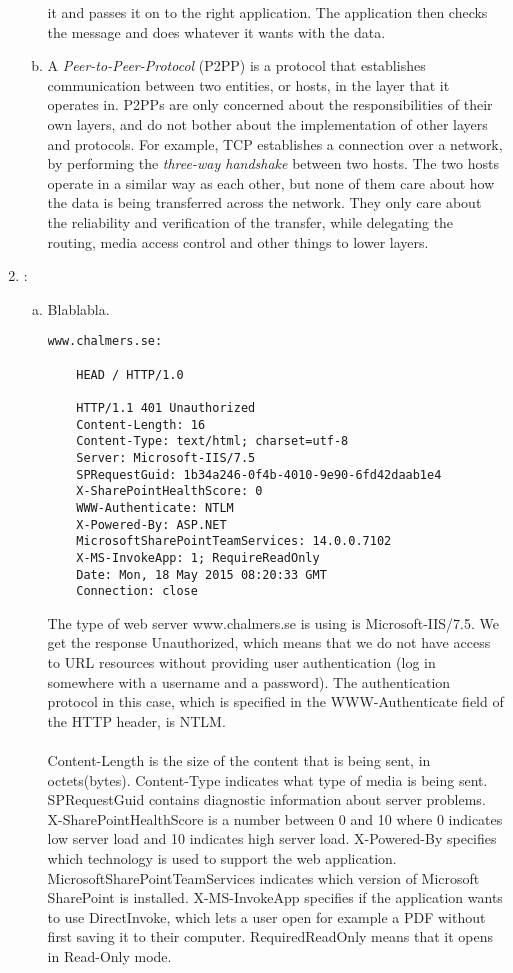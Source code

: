 \documentclass[a4paper,9pt,fleqn]{article}
\begin{document}
\begin{enumerate}[{Task} 1]
\begin{enumerate}[a)]
		it and passes it on to the right application. The application then checks
		the message and does whatever it wants with the data.
		\\
		\item 
		A {\it Peer-to-Peer-Protocol} (P2PP) is a protocol that establishes communication
		between two entities, or hosts, in the layer that it operates in. P2PPs are
		only concerned about the responsibilities of their own layers, and do not bother
		about the implementation of other layers and protocols. For example, TCP
		establishes a connection over a network, by performing the {\it three-way handshake}
		between two hosts. The two hosts operate in a similar way as each other, but none
		of them care about how the data is being transferred across the network. They only
		care about the reliability and verification of the transfer, while delegating
		the routing, media access control and other things to lower layers.
	\end{enumerate}

\item :
	\begin{enumerate}[a)]
		\item
		Blablabla.

\begin{lstlisting}
www.chalmers.se:

	HEAD / HTTP/1.0

	HTTP/1.1 401 Unauthorized
	Content-Length: 16
	Content-Type: text/html; charset=utf-8
	Server: Microsoft-IIS/7.5
	SPRequestGuid: 1b34a246-0f4b-4010-9e90-6fd42daab1e4
	X-SharePointHealthScore: 0
	WWW-Authenticate: NTLM
	X-Powered-By: ASP.NET
	MicrosoftSharePointTeamServices: 14.0.0.7102
	X-MS-InvokeApp: 1; RequireReadOnly
	Date: Mon, 18 May 2015 08:20:33 GMT
	Connection: close
\end{lstlisting}	

		The type of web server {\outp www.chalmers.se} is using is {\outp Microsoft-IIS/7.5}.
		We get the response { Unauthorized}, which means that we do not have access
		to URL resources without providing user authentication (log in somewhere with
		a username and a password). The authentication protocol in this case, which
		is specified in the {\outp WWW-Authenticate} field of the HTTP header, is {\outp NTLM}.
		\\ \\
		Content-Length is the size of the content that is being sent, in octets(bytes).
		Content-Type indicates what type of media is being sent.
		SPRequestGuid contains diagnostic information about server problems.
		X-SharePointHealthScore is a number between 0 and 10 where 0 indicates low server load and 10 indicates high server load.
		X-Powered-By specifies which technology is used to support the web application.
		MicrosoftSharePointTeamServices indicates which version of Microsoft SharePoint is installed.
		X-MS-InvokeApp specifies if the application wants to use DirectInvoke, which lets a user open for example a PDF without first saving it to their computer. 
		RequiredReadOnly means that it opens in Read-Only mode.


\end{enumerate}
\end{enumerate}
\end{document}
